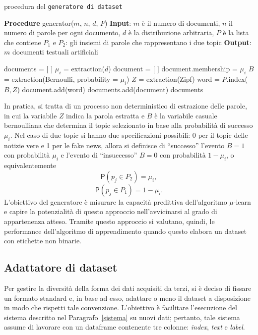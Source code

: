 \documentclass[12pt]{report}
\theoremstyle{definition}
\begin{document}
\begin{algorithm}
\caption{procedura del \texttt{generatore di dataset}}
\label{lda}
\hspace*{\algorithmicindent} \textbf{Procedure} generator($m$, $n$, $d$, $P$)
\newline
\hspace*{\algorithmicindent} \textbf{Input}: $m$ è il numero di documenti, $n$ il numero di parole per ogni documento, $d$ è la distribuzione arbitraria, $P$ è la lista che contiene $P_1$ e $P_2$: gli insiemi di parole che rappresentano i due topic
\newline
\hspace*{\algorithmicindent} \textbf{Output}: $m$ documenti testuali artificiali
\begin{algorithmic}[1]
\STATE documents = [ ]
\STATE $\mu_i$ = extraction($d$)
\STATE document = [ ]
\STATE document.membership = $\mu_i$
\STATE $B$ = extraction(Bernoulli, probability = $\mu_i$)
\STATE $Z$ = extraction(Zipf)
\STATE word = $P$.index($B, Z$)
\STATE document.add(word)
\ENDFOR
\STATE documents.add(document)
\ENDFOR
\RETURN documents
\end{algorithmic}
\end{algorithm}
In pratica, si tratta di un processo non deterministico di estrazione delle parole, in cui la variabile $Z$ indica la parola estratta e $B$ è la variabile casuale bernoulliana che determina il topic selezionato in base alla probabilità di successo $\mu_i$. Nel caso di due topic si hanno due specificazioni possibili: 0 per il topic delle notizie vere e 1 per le fake news, allora si definisce di ``successo'' l'evento $B=1$ con probabilità $\mu_i$ e l'evento di ``insuccesso'' $B=0$ con probabilità $1-\mu_i$, o equivalentemente
\begin{equation}
    \mathsf{P}(p_j \in P_2) = \mu_i,
\end{equation}
\begin{equation}
    \mathsf{P}(p_j \in P_1) = 1 - \mu_i.
\end{equation}
L'obiettivo del generatore è misurare la capacità predittiva dell'algoritmo $\mu$-learn e capire la potenzialità di questo approccio nell'avvicinarsi al grado di appartenenza atteso. Tramite questo approccio si valutano, quindi, le performance dell'algoritmo di apprendimento quando questo elabora un dataset con etichette non binarie.

\subsection{Adattatore di dataset}\label{adapter}
Per gestire la diversità della forma dei dati acquisiti da terzi, si è deciso di fissare un formato standard e, in base ad esso, adattare o meno il dataset a disposizione in modo che rispetti tale convenzione. L'obiettivo è facilitare l'esecuzione del sistema descritto nel Paragrafo~\ref{sistema} su nuovi dati; pertanto, tale sistema assume di lavorare con un dataframe contenente tre colonne: \textit{index}, \textit{text} e \textit{label}.
\end{document}
